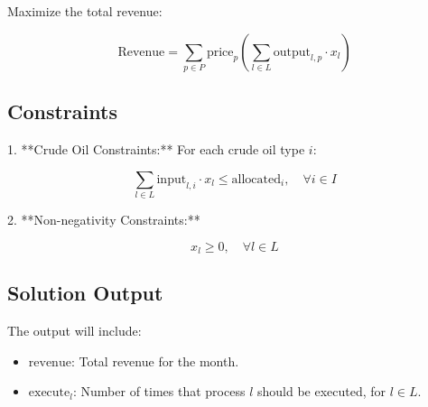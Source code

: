 \documentclass{article}
\begin{document}
Maximize the total revenue:

\[
\text{Revenue} = \sum_{p \in P} \text{price}_p \left( \sum_{l \in L} \text{output}_{l,p} \cdot x_l \right)
\]
 
\subsection*{Constraints}

1. **Crude Oil Constraints:** For each crude oil type \( i \):

\[
\sum_{l \in L} \text{input}_{l,i} \cdot x_l \leq \text{allocated}_i, \quad \forall i \in I
\]

2. **Non-negativity Constraints:**

\[
x_l \geq 0, \quad \forall l \in L
\]

\subsection*{Solution Output}

The output will include:

\begin{itemize}
    \item \( \text{revenue} \): Total revenue for the month.
    \item \( \text{execute}_l \): Number of times that process \( l \) should be executed, for \( l \in L \).
\end{itemize}
\end{document}
